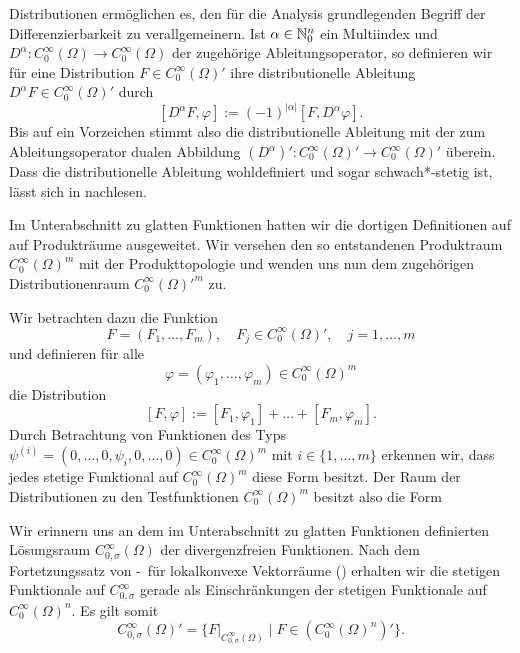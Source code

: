Distributionen ermöglichen es, den für die Analysis grundlegenden Begriff der Differenzierbarkeit zu verallgemeinern.
Ist $\alpha \in \mathbb{N}_0^n$ ein Multiindex und $D^\alpha \colon C_0^\infty(\Omega) \to C_0^\infty(\Omega)$ der zugehörige Ableitungsoperator, so definieren wir für eine Distribution $F \in C_0^\infty(\Omega)'$ ihre distributionelle Ableitung $D^\alpha F \in C_0^\infty(\Omega)'$ durch
$$
  [D^\alpha F, \varphi] := (-1)^{|\alpha|} [F, D^\alpha \varphi].
$$
Bis auf ein Vorzeichen stimmt also die distributionelle Ableitung mit der zum Ableitungsoperator dualen Abbildung $(D^\alpha)' \colon C_0^\infty(\Omega)' \to C_0^\infty(\Omega)'$ überein.
Dass die distributionelle Ableitung wohldefiniert und sogar schwach*-stetig ist, lässt sich in \cite[S.434, Lemma VIII.5.7]{werner2011fa} nachlesen.

Im Unterabschnitt zu glatten Funktionen hatten wir die dortigen Definitionen auf auf Produkträume ausgeweitet.
Wir versehen den so entstandenen Produktraum $C_0^\infty(\Omega)^m$ mit der Produkttopologie und wenden uns nun dem zugehörigen Distributionenraum $C_0^\infty(\Omega)'^m$ zu.

Wir betrachten dazu die Funktion
$$
  F = (F_1, \dots, F_m), \quad F_j \in C_0^\infty(\Omega)', \quad j = 1, \dots, m
$$
und definieren für alle 
$$\varphi = (\varphi_1, \dots, \varphi_m) \in C_0^\infty(\Omega)^m$$
die Distribution
\begin{equation}
  \label{eq:pairingVector}
  [F, \varphi] := [F_1, \varphi_1] + \dots + [F_m, \varphi_m].
\end{equation}
Durch Betrachtung von Funktionen des Typs $\psi^{(i)} = (0, \dots,0, \psi_i, 0,\dots,0) \in C_0^\infty(\Omega)^m$ mit $i \in \{1,\dots,m\}$ erkennen wir, dass jedes stetige Funktional auf $C_0^\infty(\Omega)^m$ diese Form besitzt.
Der Raum der Distributionen zu den Testfunktionen $C_0^\infty(\Omega)^m$ besitzt also die Form

Wir erinnern uns an dem im Unterabschnitt zu glatten Funktionen definierten Lösungsraum $C_{0, \sigma}^\infty(\Omega)$ der divergenzfreien Funktionen.
Nach dem Fortetzungssatz von \hahn\hyp{}\banach\ für lokalkonvexe Vektorräume (\cite[S.408, Satz VIII.2.8]{werner2011fa}) erhalten wir die stetigen Funktionale auf $C_{0,\sigma}^\infty$ gerade als Einschränkungen der stetigen Funktionale auf $C_0^\infty(\Omega)^n$. Es gilt somit
$$
C_{0,\sigma}^\infty(\Omega)' = \{F|_{C_{0,\sigma}^\infty(\Omega)} \mid F \in (C_0^\infty(\Omega)^n)'\}.
$$

